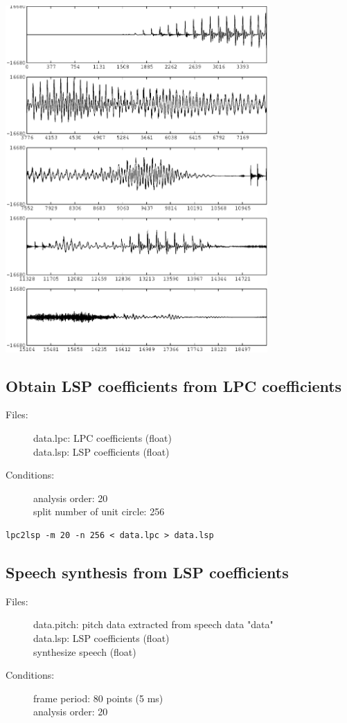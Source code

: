 \documentclass[a4paper,10pt]{article}
\begin{document}
\includegraphics[width=10cm]{data.par.syn.gwave.eps}

\subsection{Obtain LSP coefficients from LPC coefficients}
\begin{description}
\item[Files:]
   data.lpc: LPC coefficients (float)\\
   data.lsp: LSP coefficients (float)
\item[Conditions:]
  analysis order: 20\\
  split number of unit circle: 256
\end{description}

\begin{verbatim}
lpc2lsp -m 20 -n 256 < data.lpc > data.lsp
\end{verbatim}

\subsection{Speech synthesis from LSP coefficients}

\begin{description}
\item[Files:]
  data.pitch: pitch data extracted from speech data "data"\\
  data.lsp: LSP coefficients (float)\\
  synthesize speech (float)
\item[Conditions:]
  frame period: 80 points (5 ms)\\
  analysis order: 20
\end{description}
\end{document}
